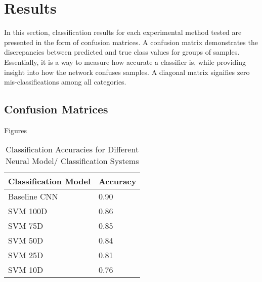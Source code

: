 \documentclass[conference]{IEEEtran}
\begin{document}
\section{Results} \label{Results}

In this section, classification results for each experimental method tested are presented in the form of confusion matrices.  A confusion matrix demonstrates the discrepancies between predicted and true class values for groups of samples.  Essentially, it is a way to measure how accurate a classifier is, while providing insight into how the network confuses samples.  A diagonal matrix signifies zero mis-classifications among all categories.

\subsection{Confusion Matrices}
Figures 

\begin{table}[h!]
	\caption{Classification Accuracies for Different Neural Model/ Classification Systems}
	\label{tab:step1comparison}
	\normalsize
		\begin{tabularx}{\columnwidth}{ |X|X| } 
			\hline
			\centering \textbf{Classification Model}  & \textbf{Accuracy} \\
			\hline
			\centering Baseline CNN & 0.90 \\
			\hline
			\centering SVM 100D & 0.86 \\
			\hline
			\centering SVM 75D & 0.85 \\
			\hline
			\centering SVM 50D & 0.84 \\
			\hline
			\centering SVM 25D & 0.81 \\
			\hline
			\centering SVM 10D & 0.76 \\
			\hline
		\end{tabularx}
\end{table} 
 

\vspace{5cm}
\end{document}
